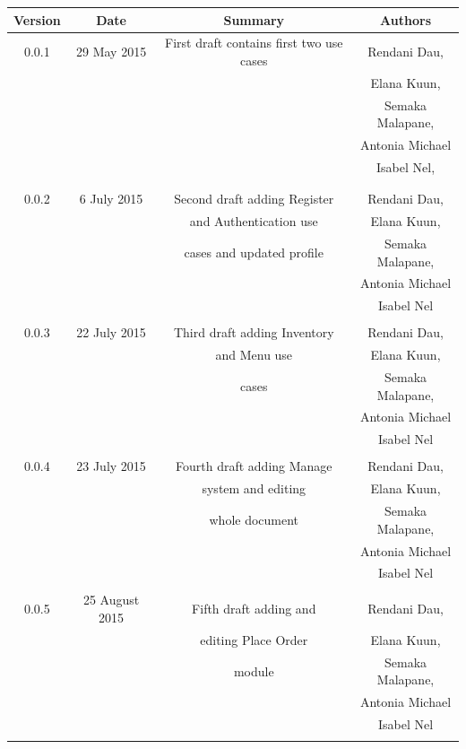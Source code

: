 \documentclass[a4paper,12pt]{report}
\begin{document}
\begin{table}[h!]
\centering
 \begin{tabular}{||c c c c||} 
 \hline
 \textbf{Version} & \textbf{Date} & \textbf{Summary} & \textbf{Authors} \\ [0.5ex] 
 \hline\hline
 0.0.1 & 29 May 2015 &  First draft contains first two use cases  & Rendani Dau, \\ & & & Elana Kuun, \\ & & & Semaka Malapane, \\ & & & Antonia Michael \\ & & & Isabel Nel, \\ & & & \\
 \hline 
 & & & \\
 0.0.2 & 6 July 2015 &  Second draft adding Register & Rendani Dau, \\ & & and Authentication use & Elana Kuun, \\ & & cases and updated profile & Semaka Malapane, \\ & & &  Antonia Michael \\ & & & Isabel Nel \\   [1ex] 
 \hline
& & & \\
 0.0.3 & 22 July 2015 &  Third draft adding Inventory & Rendani Dau, \\ & & and Menu use & Elana Kuun, \\ & & cases  & Semaka Malapane, \\ & & &  Antonia Michael \\ & & & Isabel Nel \\   [1ex] 
 \hline
& & & \\
 0.0.4 & 23 July 2015 &  Fourth draft adding Manage & Rendani Dau, \\ & & system and editing & Elana Kuun, \\ & & whole document  & Semaka Malapane, \\ & & &  Antonia Michael \\ & & & Isabel Nel \\   [1ex] 
 \hline
& & & \\
 0.0.5 & 25 August 2015 &  Fifth draft adding and & Rendani Dau, \\ & & editing Place Order  & Elana Kuun, \\ & & module  & Semaka Malapane, \\ & & &  Antonia Michael \\ & & & Isabel Nel \\   [1ex] 
\hline
& & & \\

\end{tabular}
\end{table}
\end{document}

